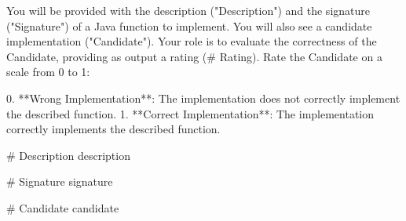You will be provided with the description ("Description") and the signature ("Signature") of a Java function to implement. You will also see a candidate implementation ("Candidate"). Your role is to evaluate the correctness of the Candidate, providing as output a rating (# Rating). Rate the Candidate on a scale from 0 to 1:

0. **Wrong Implementation**: The implementation does not correctly implement the described function.
1. **Correct Implementation**: The implementation correctly implements the described function.

# Description
{description}

# Signature
{signature}

# Candidate
{candidate}
